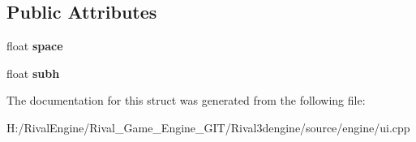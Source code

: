 \subsection*{Public Attributes}
\begin{DoxyCompactItemize}
\item 
\mbox{\label{struct_u_i_1_1_vertical_list_a49d97818933e11af3299855654789813}} 
float {\bfseries space}
\item 
\mbox{\label{struct_u_i_1_1_vertical_list_a40761c64230e03f0505836d1cfb619d7}} 
float {\bfseries subh}
\end{DoxyCompactItemize}


The documentation for this struct was generated from the following file\+:\begin{DoxyCompactItemize}
\item 
H\+:/\+Rival\+Engine/\+Rival\+\_\+\+Game\+\_\+\+Engine\+\_\+\+G\+I\+T/\+Rival3dengine/source/engine/ui.\+cpp\end{DoxyCompactItemize}
